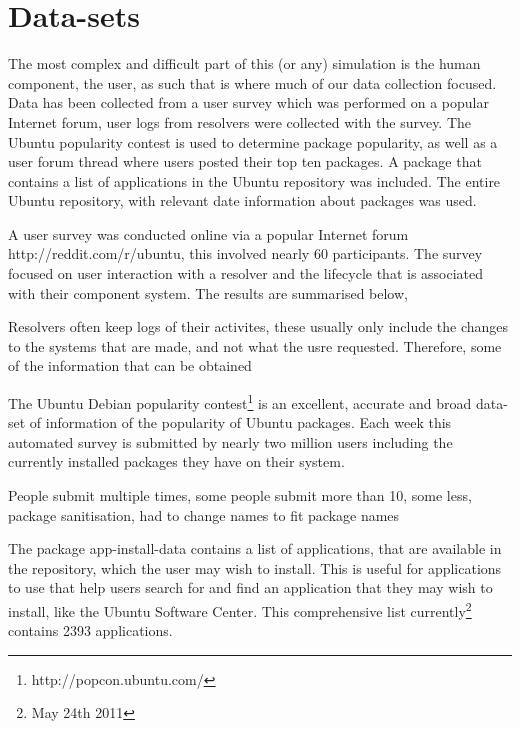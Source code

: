 

\section{Data-sets}
The most complex and difficult part of this (or any) simulation is the human component, the user,
as such that is where much of our data collection focused.
Data has been collected from
a user survey which was performed on a popular Internet forum,
user logs from resolvers were collected with the survey.
The Ubuntu popularity contest is used to determine package popularity,
as well as a user forum thread where users posted their top ten packages.
A package that contains a list of applications in the Ubuntu repository was included.
The entire Ubuntu repository, with relevant date information about packages was used.

A user survey was conducted online via a popular Internet forum http://reddit.com/r/ubuntu, this involved nearly 60 participants. %
The survey focused on user interaction with a resolver and the lifecycle that is associated with their component system.
The results are summarised below, %

Resolvers often keep logs of their activites, these usually only include the changes to the systems that are made, and not what the usre requested.
Therefore, some of the information that can be obtained

The Ubuntu Debian popularity contest\footnote{http://popcon.ubuntu.com/} is an excellent, accurate and broad data-set of information of the popularity of Ubuntu packages.
Each week this automated survey is submitted by nearly two million users including the currently installed packages they have on their system.

People submit multiple times, some people submit more than 10, some less, package sanitisation, had to change names to fit package names

The package app-install-data contains a list of applications, that are available in the repository, which the user may wish to install.
This is useful for applications to use that help users search for and find an application that they may wish to install, like the Ubuntu Software Center.
This comprehensive list currently\footnote{May 24th 2011} contains 2393 applications.

